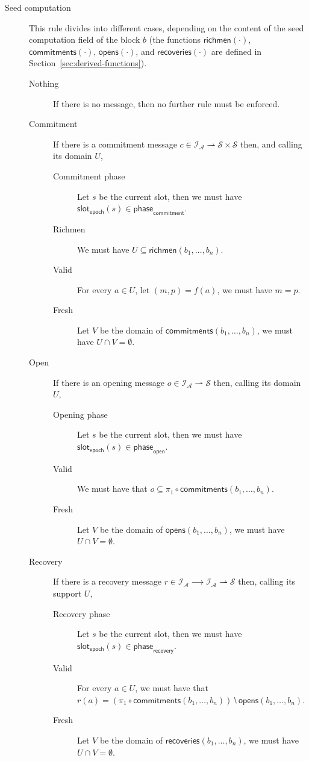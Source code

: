 \documentclass{article}
\newcommand{\idsof}[1]{\mathcal{I}\!_#1}
\newcommand{\agentids}{\idsof{\mathcal{A}}}
\newcommand{\seeds}{\mathcal{S}}
\newcommand{\epochslot}[1]{\mathsf{slot}_\mathsf{epoch}(#1)}
\newcommand{\commitphase}{\mathsf{phase}_\mathsf{commitment}}
\newcommand{\openphase}{\mathsf{phase}_\mathsf{open}}
\newcommand{\recoveryphase}{\mathsf{phase}_\mathsf{recovery}}
\newcommand{\epochcommitments}[1]{\mathsf{commitments}(#1)}
\newcommand{\epochopens}[1]{\mathsf{opens}(#1)}
\newcommand{\epochrecoveries}[1]{\mathsf{recoveries}(#1)}
\newcommand{\richmen}[1]{\mathsf{richmen}(#1)}
\begin{document}
\begin{description}
\item[Seed computation] This rule divides into different cases, depending on the
  content of the seed computation field of the block $b$ (the functions
  $\richmen{⋅}$, $\epochcommitments{⋅}$, $\epochopens{⋅}$, and
  $\epochrecoveries{⋅}$ are defined in Section~\ref{sec:derived-functions}).
  \begin{description}
  \item[Nothing] If there is no message, then no further rule must be
    enforced.
  \item[Commitment] If there is a commitment message $c ∈
    \agentids⇀\seeds×\seeds$ then, and calling its domain $U$,
    \begin{description}
    \item[Commitment phase] Let $s$ be the current slot, then we must
      have $\epochslot{s}∈\commitphase$.
    \item[Richmen] We must have $U⊆\richmen{b_1,…,b_n}$.
    \item[Valid] For every $a∈U$, let $(m,p) = f(a)$, we must have
      $m=p$.
    \item[Fresh] Let $V$ be the domain of $\epochcommitments{b_1,…,b_n}$,
      we must have $U∩V=∅$.
    \end{description}
  \item[Open] If there is an opening message $o ∈
    \agentids⇀\seeds$ then, calling its domain $U$,
    \begin{description}
    \item[Opening phase] Let $s$ be the current slot, then we must
      have $\epochslot{s}∈\openphase$.
    \item[Valid] We must have that $o ⊆ π_1 ∘
      \epochcommitments{b_1,…,b_n}$.
    \item[Fresh] Let $V$ be the domain of $\epochopens{b_1,…,b_n}$,
      we must have $U∩V=∅$.
    \end{description}
  \item[Recovery] If there is a recovery message $r ∈
    \agentids⟶\agentids⇀\seeds$ then, calling its support $U$,
    \begin{description}
    \item[Recovery phase] Let $s$ be the current slot, then we must
      have $\epochslot{s}∈\recoveryphase$.
    \item[Valid] For every $a∈U$, we must have that $r(a) = (π_1 ∘ \epochcommitments{b_1,…,b_n})⧵\epochopens{b_1,…,b_n}$.
    \item[Fresh] Let $V$ be the domain of $\epochrecoveries{b_1,…,b_n}$,
      we must have $U∩V=∅$.
    \end{description}

  \end{description}


\end{description}
\end{document}
